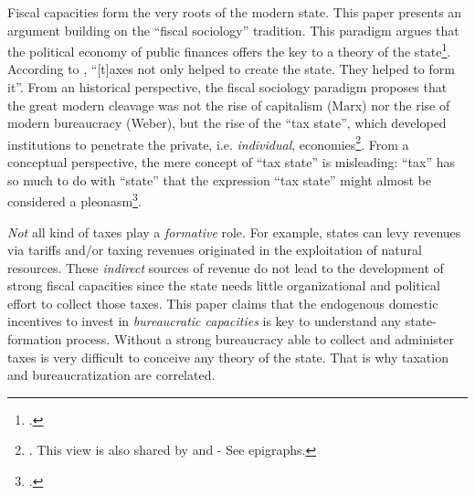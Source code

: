 \documentclass[onesided]{article}\usepackage[]{graphicx}\usepackage[]{color}
\begin{document}
Fiscal capacities form the very roots of the modern state. This paper presents an argument building on the ``fiscal sociology'' tradition. This paradigm argues that the political economy of public finances offers the key to a theory of the state\footnote{	\citet[p. 99]{Musgrave1992}.}. According to \citet[p. 108]{Schumpeter:1991yq}, ``[t]axes not only helped to create the state. They helped to form it''. From an historical perspective, the fiscal sociology paradigm proposes that the great modern cleavage was not the rise of capitalism (Marx) nor the rise of modern bureaucracy (Weber), but the rise of the ``tax state'', which developed institutions to penetrate the private, i.e. \emph{individual}, economies\footnote{\citet[p. 298]{Moore2004a}. This view is also shared by \citet[p. 100]{Schumpeter:1991yq} and \citet[p. 42]{Lewis:1965fr} - See epigraphs.}. From a conceptual perspective, the mere concept of ``tax state'' is misleading: ``tax'' has so much to do with ``state'' that the expression ``tax state'' might almost be considered a pleonasm\footnote{\citet[p. 101]{Schumpeter:1991yq}.}.

\emph{Not} all kind of taxes play a \emph{formative} role. For example, states can levy revenues via tariffs and/or taxing revenues originated in the exploitation of natural resources. These \emph{indirect} sources of revenue do not lead to the development of strong fiscal capacities since the state needs little organizational and political effort to collect those taxes. This paper claims that the endogenous domestic incentives to invest in \emph{bureaucratic capacities} is key to understand any state-formation process. Without a strong bureaucracy able to collect and administer taxes is very difficult to conceive any theory of the state. That is why taxation and bureaucratization are correlated. 




\end{document}

